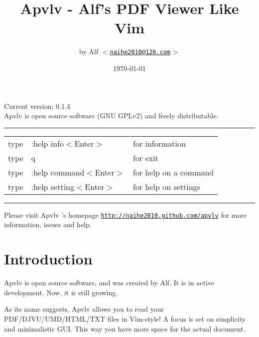 \documentclass[a4paper,12pt]{article}
\newcommand{\apvlv}{\textsf{Apvlv{ }}}
\begin{document}
\large

\title{Apvlv - Alf's PDF Viewer Like Vim}
\author{by Alf \texttt{$<$\href{mailto:naihe2010@126.com}{naihe2010@126.com}$>$}}
\date{\today}
\maketitle{}

\begin{center}
Current version: 0.1.4\\
\vspace{1cm}
\apvlv is open source software (GNU GPLv2) and freely distributable.
\vspace{1cm}

\rule{\textwidth}{1pt}
\begin{tabular}{lll}
type & :help info$<$Enter$>$      & for information \\
type & q                          & for exit \\
type & :help command$<$Enter$>$   & for help on a command \\
type & :help setting$<$Enter$>$   & for help on settings \\ %
\end{tabular}
\rule{\textwidth}{1pt}

\vspace{3cm}
{\small Please visit \apvlv's homepage \texttt{\href{http://naihe2010.github.com/apvlv}{http://naihe2010.github.com/apvlv}} for more information, issues and help.}
\end{center}

\newpage

\section{Introduction}\label{intro}

\apvlv is open source software, and was created by Alf. It is in active development. Now, it is still growing.

As its name suggests, \apvlv allows you to read your PDF/\-DJVU/\-UMD/\-HTML/\-TXT files in Vim-style! A focus is set on simplicity and minimalistic GUI. This way you have more space for the actual document.
\end{document}
